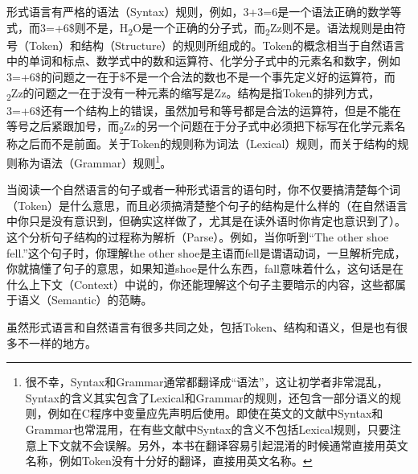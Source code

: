 形式语言有严格的语法（Syntax）规则，例如，3+\BookSplit{}3=\BookSplit{}6是一个语法正确的数学等式，而3=\BookSplit{}+\BookSplit{}6\$则不是，H\textsubscript{2}O是一个正确的分子式，而\textsubscript{2}Zz则不是。语法规则是由符号（Token）和结构（Structure）的规则所组成的。Token的概念相当于自然语言中的单词和标点、数学式中的数和运算符、化学分子式中的元素名和数字，例如3=\BookSplit{}+\BookSplit{}6\$的问题之一在于\$不是一个合法的数也不是一个事先定义好的运算符，而\textsubscript{2}Zz的问题之一在于没有一种元素的缩写是Zz。结构是指Token的排列方式，3=\BookSplit{}+\BookSplit{}6\$还有一个结构上的错误，虽然加号和等号都是合法的运算符，但是不能在等号之后紧跟加号，而\textsubscript{2}Zz的另一个问题在于分子式中必须把下标写在化学元素名称之后而不是前面。关于Token的规则称为词法（Lexical）规则，而关于结构的规则称为语法（Grammar）规则\footnote[1]{很不幸，Syntax和Grammar通常都翻译成“语法”，这让初学者非常混乱，Syntax的含义其实包含了Lexical和Grammar的规则，还包含一部分语义的规则，例如在C程序中变量应先声明后使用。即使在英文的文献中Syntax和Grammar也常混用，在有些文献中Syntax的含义不包括Lexical规则，只要注意上下文就不会误解。另外，本书在翻译容易引起混淆的时候通常直接用英文名称，例如Token没有十分好的翻译，直接用英文名称。}。



当阅读一个自然语言的句子或者一种形式语言的语句时，你不仅要搞清楚每个词（Token）是什么意思，而且必须搞清楚整个句子的结构是什么样的（在自然语言中你只是没有意识到，但确实这样做了，尤其是在读外语时你肯定也意识到了）。这个分析句子结构的过程称为解析（Parse）。例如，当你听到“The other shoe fell.\BookSplit{}”这个句子时，你理解the other shoe是主语而fell是谓语动词，一旦解析完成，你就搞懂了句子的意思，如果知道shoe是什么东西，fall意味着什么，这句话是在什么上下文（Context）中说的，你还能理解这个句子主要暗示的内容，这些都属于语义（Semantic）的范畴。



虽然形式语言和自然语言有很多共同之处，包括Token、结构和语义，但是也有很多不一样的地方。


